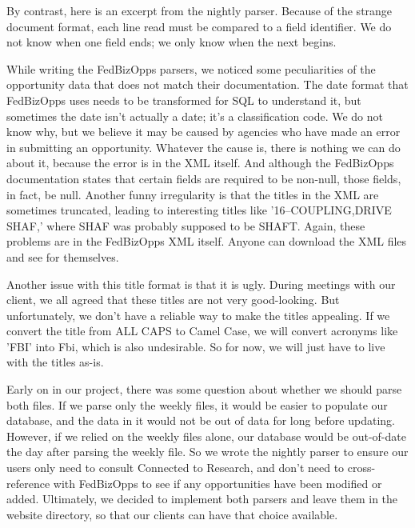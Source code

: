 \documentclass[onecolumn]{IEEEtran}
\begin{document}
By contrast, here is an excerpt from the nightly parser. Because of the strange document format, each line read must be compared to a field identifier. We do not know when one field ends; we only know when the next begins.


While writing the FedBizOpps parsers, we noticed some peculiarities of the opportunity data that does not match their documentation. The date format that FedBizOpps uses needs to be transformed for SQL to understand it, but sometimes the date isn't actually a date; it's a classification code. We do not know why, but we believe it may be caused by agencies who have made an error in submitting an opportunity. Whatever the cause is, there is nothing we can do about it, because the error is in the XML itself. And although the FedBizOpps documentation states that certain fields are required to be non-null, those fields, in fact, be null. Another funny irregularity is that the titles in the XML are sometimes truncated, leading to interesting titles like '16--COUPLING,DRIVE SHAF,' where SHAF was probably supposed to be SHAFT. Again, these problems are in the FedBizOpps XML itself. Anyone can download the XML files and see for themselves. 

Another issue with this title format is that it is ugly. During meetings with our client, we all agreed that these titles are not very good-looking. But unfortunately, we don't have a reliable way to make the titles appealing. If we convert the title from ALL CAPS to Camel Case, we will convert acronyms like 'FBI' into Fbi, which is also undesirable. So for now, we will just have to live with the titles as-is.

Early on in our project, there was some question about whether we should parse both files. If we parse only the weekly files, it would be easier to populate our database, and the data in it would not be out of data for long before updating. However, if we relied on the weekly files alone, our database would be out-of-date the day after parsing the weekly file. So we wrote the nightly parser to ensure our users only need to consult Connected to Research, and don't need to cross-reference with FedBizOpps to see if any opportunities have been modified or added. Ultimately, we decided to implement both parsers and leave them in the website directory, so that our clients can have that choice available.
\end{document}

